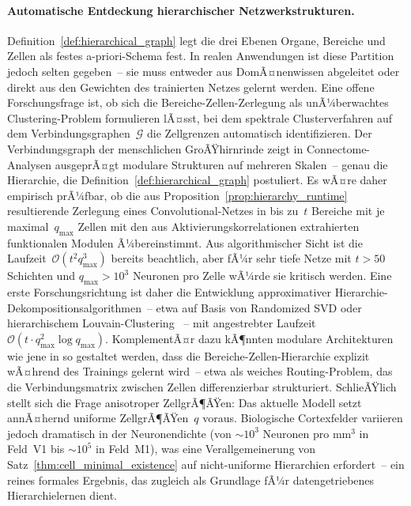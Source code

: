 ﻿\documentclass[12pt, a4paper, openany]{report}
\newcommand{\calG}{\mathcal{G}}
\begin{document}
\paragraph{Automatische Entdeckung hierarchischer Netzwerkstrukturen.}
Definition~\ref{def:hierarchical_graph} legt die drei Ebenen Organe,
Bereiche und Zellen als festes a-priori-Schema fest.  In realen
Anwendungen ist diese Partition jedoch selten gegeben~-- sie muss entweder
aus DomÃ¤nenwissen abgeleitet oder direkt aus den Gewichten des trainierten
Netzes gelernt werden.  Eine offene Forschungsfrage ist, ob sich die
Bereiche-Zellen-Zerlegung als unÃ¼berwachtes Clustering-Problem formulieren
lÃ¤sst, bei dem spektrale Clusterverfahren auf dem Verbindungsgraphen~$\calG$
die Zellgrenzen automatisch identifizieren.
Der Verbindungsgraph der menschlichen GroÃŸhirnrinde zeigt in Connectome-
Analysen \cite{sporns05} ausgeprÃ¤gt modulare Strukturen auf mehreren
Skalen~-- genau die Hierarchie, die Definition~\ref{def:hierarchical_graph}
postuliert.  Es wÃ¤re daher empirisch prÃ¼fbar, ob die aus
Proposition~\ref{prop:hierarchy_runtime} resultierende Zerlegung eines
Convolutional-Netzes in bis zu~$t$ Bereiche mit je maximal~$q_{\max}$ Zellen
mit den aus Aktivierungskorrelationen extrahierten funktionalen Modulen Ã¼bereinstimmt.
Aus algorithmischer Sicht ist die Laufzeit~$\mathcal{O}(t^2 q_{\max}^3)$
bereits beachtlich, aber fÃ¼r sehr tiefe Netze mit $t > 50$ Schichten und
$q_{\max} > 10^3$ Neuronen pro Zelle wÃ¼rde sie kritisch werden.  Eine erste
Forschungsrichtung ist daher die Entwicklung approximativer
Hierarchie-Dekompositionsalgorithmen~-- etwa auf Basis von Randomized SVD
oder hierarchischem Louvain-Clustering \cite{barabasi99}~-- mit angestrebter
Laufzeit~$\mathcal{O}(t \cdot q_{\max}^2 \log q_{\max})$.  KomplementÃ¤r
dazu kÃ¶nnten modulare Architekturen wie jene in \cite{goyal22} so gestaltet
werden, dass die Bereiche-Zellen-Hierarchie explizit wÃ¤hrend des Trainings
gelernt wird~-- etwa als weiches Routing-Problem, das die Verbindungsmatrix
zwischen Zellen differenzierbar strukturiert.
SchlieÃŸlich stellt sich die Frage anisotroper ZellgrÃ¶ÃŸen: Das aktuelle Modell
setzt annÃ¤hernd uniforme ZellgrÃ¶ÃŸen~$q$ voraus.  Biologische Cortexfelder
variieren jedoch dramatisch in der Neuronendichte (von $\sim\!10^3$ Neuronen
pro mm$^3$ in Feld~V1 bis $\sim\!10^5$ in Feld~M1), was eine Verallgemeinerung
von Satz~\ref{thm:cell_minimal_existence} auf nicht-uniforme Hierarchien
erfordert~-- ein reines formales Ergebnis, das zugleich als Grundlage fÃ¼r
datengetriebenes Hierarchielernen dient.
\end{document}
